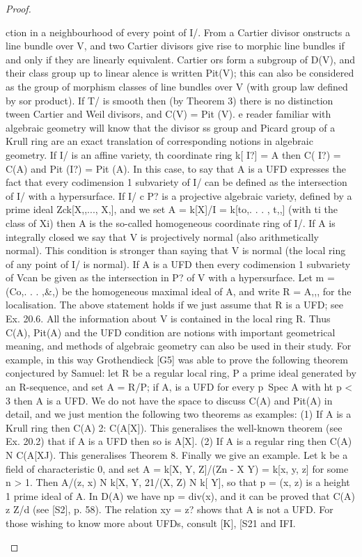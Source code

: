 \begin{proof}
\begin{mathematicalrecord}
         ction in a neighbourhood of every point of I/. From a Cartier divisor
          onstructs a line bundle over V, and two Cartier divisors give rise to
      morphic line bundles if and only if they are linearly equivalent. Cartier
         ors form a subgroup of D(V), and their class group up to linear
          alence is written Pit(V); this can also be considered as the group of
      morphism classes of line bundles over V (with group law defined by
       sor product). If T/ is smooth then (by Theorem 3) there is no distinction
     tween Cartier and Weil divisors, and C(V) = Pit (V).
         e reader familiar with algebraic geometry will know that the divisor
      ss group and Picard group of a Krull ring are an exact translation of
        corresponding notions in algebraic geometry. If I/ is an affine variety,
     th coordinate ring k[ I?] = A then C( I?) = C(A) and Pit (I?) = Pit (A). In
this case, to say that A is a UFD expresses the fact that every codimension
  1 subvariety of I/ can be defined as the intersection of I/ with a hypersurface.
 If I/ c P? is a projective algebraic variety, defined by a prime ideal
 Zck[X,,...,      X,], and we set A = k[X]/I = k[to,. . . , t,,] (with ti the
 class of Xi) then A is the so-called homogeneous coordinate ring of I/. If
 A is integrally closed we say that V is projectively normal (also
 arithmetically normal). This condition is stronger than saying that V is
 normal (the local ring of any point of I/ is normal). If A is a UFD then
 every codimension 1 subvariety of Vcan be given as the intersection in
 P? of V with a hypersurface. Let m = (Co,. . . ,&,) be the homogeneous
 maximal ideal of A, and write R = A,,, for the localisation. The above
 statement holds if we just assume that R is a UFD; see Ex. 20.6. All the
 information about V is contained in the local ring R.
     Thus C(A), Pit(A) and the UFD condition are notions with important
 geometrical meaning, and methods of algebraic geometry can also be used
 in their study. For example, in this way Grothendieck [G5] was able to
 prove the following theorem conjectured by Samuel: let R be a regular
 local ring, P a prime ideal generated by an R-sequence, and set A = R/P;
 if A, is a UFD for every p~Spec A with ht p < 3 then A is a UFD.
     We do not have the space to discuss C(A) and Pit(A) in detail, and we
just mention the following two theorems as examples:
     (1) If A is a Krull ring then C(A) 2: C(A[X]).
     This generalises the well-known theorem (see Ex. 20.2) that if A is a UFD
then so is A[X].
     (2) If A is a regular ring then C(A) N C(A[XJ).
     This generalises Theorem 8.
     Finally we give an example. Let k be a field of characteristic 0, and set
 A = k[X, Y, Z]/(Zn - X Y) = k[x, y, z] for some n > 1. Then A/(z, x) N
 k[X, Y, 21/(X, Z) N k[ Y], so that p = (x, z) is a height 1 prime ideal of A.
 In D(A) we have np = div(x), and it can be proved that C(A) z Z/d (see
 [S2], p. 58). The relation xy = z? shows that A is not a UFD.
     For those wishing to know more about UFDs, consult [K], [S21 and
IFI.
\end{mathematicalrecord}
\end{proof}


